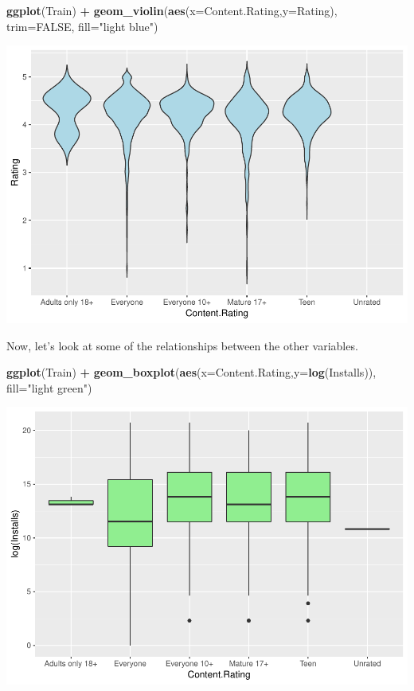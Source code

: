 \documentclass[]{article}
\newenvironment{Shaded}{\begin{snugshade}}{\end{snugshade}}
\newcommand{\DataTypeTok}[1]{\textcolor[rgb]{0.13,0.29,0.53}{#1}}
\newcommand{\KeywordTok}[1]{\textcolor[rgb]{0.13,0.29,0.53}{\textbf{#1}}}
\newcommand{\NormalTok}[1]{#1}
\newcommand{\OperatorTok}[1]{\textcolor[rgb]{0.81,0.36,0.00}{\textbf{#1}}}
\newcommand{\OtherTok}[1]{\textcolor[rgb]{0.56,0.35,0.01}{#1}}
\newcommand{\StringTok}[1]{\textcolor[rgb]{0.31,0.60,0.02}{#1}}
\begin{document}
\begin{Shaded}
\begin{Highlighting}[]
\KeywordTok{ggplot}\NormalTok{(Train) }\OperatorTok{+}\StringTok{ }\KeywordTok{geom_violin}\NormalTok{(}\KeywordTok{aes}\NormalTok{(}\DataTypeTok{x=}\NormalTok{Content.Rating,}\DataTypeTok{y=}\NormalTok{Rating), }\DataTypeTok{trim=}\OtherTok{FALSE}\NormalTok{, }\DataTypeTok{fill=}\StringTok{"light blue"}\NormalTok{)}
\end{Highlighting}
\end{Shaded}

\includegraphics{Project_2_Work_files/figure-latex/unnamed-chunk-16-5.pdf}

Now, let's look at some of the relationships between the other
variables.

\begin{Shaded}
\begin{Highlighting}[]
\KeywordTok{ggplot}\NormalTok{(Train) }\OperatorTok{+}\StringTok{ }\KeywordTok{geom_boxplot}\NormalTok{(}\KeywordTok{aes}\NormalTok{(}\DataTypeTok{x=}\NormalTok{Content.Rating,}\DataTypeTok{y=}\KeywordTok{log}\NormalTok{(Installs)), }\DataTypeTok{fill=}\StringTok{"light green"}\NormalTok{)}
\end{Highlighting}
\end{Shaded}

\includegraphics{Project_2_Work_files/figure-latex/unnamed-chunk-17-1.pdf}
\end{document}
